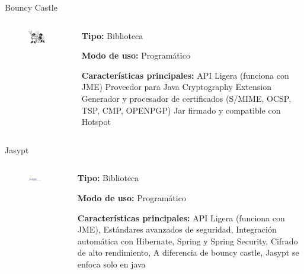 \documentclass[12pt]{beamer}
\begin{document}
\begin{frame}{Bouncy Castle}
  \begin{columns}
      \begin{column}{.5\linewidth}
  	    \begin{figure}
  	    \centering
  	    \includegraphics[width=0.6\linewidth]{Images/bouncyjava.png}
  	    \end{figure}
      \end{column}
    \begin{column}{.5\linewidth}
\textbf{Tipo:} Biblioteca

\textbf{Modo de uso:} Programático

\textbf{Características principales:}
API Ligera (funciona con JME)
Proveedor para Java Cryptography Extension
Generador y procesador de certificados (S/MIME, OCSP, TSP, CMP, OPENPGP)
Jar firmado y compatible con Hotspot
    \end{column}

  \end{columns}
\end{frame}

\begin{frame}{Jasypt}
  \begin{columns}
      \begin{column}{.5\linewidth}
  	    \begin{figure}
  	    \centering
  	    \includegraphics[width=0.6\linewidth]{Images/jasypt.png}
  	    \end{figure}
      \end{column}
    \begin{column}{.5\linewidth}
\textbf{Tipo:} Biblioteca

\textbf{Modo de uso:} Programático

\textbf{Características principales:}
API Ligera (funciona con JME), 
Estándares avanzados de seguridad, 
Integración automática con Hibernate, Spring y Spring Security, 
Cifrado de alto rendimiento, 
A diferencia de bouncy castle, Jasypt se enfoca solo en java
    \end{column}

  \end{columns}
\end{frame}
\end{document}
